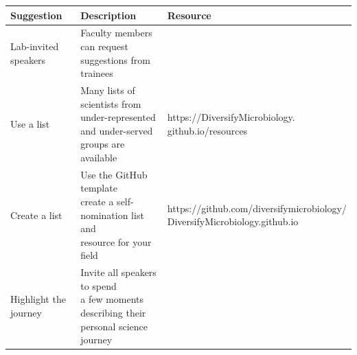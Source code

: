 \documentclass[10pt,]{article}
\begin{document}
\newpage

\begin{center}
\small
\begin{tabular}{|l|l|l|}
\hline

\rowcolor{lightgray}
\textbf{Suggestion} & \textbf{Description} & \textbf{Resource} \\ \hline

Lab-invited speakers & \makecell[l]{Faculty members can request \\suggestions from trainees} & \\ \hline

Use a list & \makecell[l]{Many lists of scientists from \\under-represented and under-served \\groups are available} &  \makecell[l]{https://DiversifyMicrobiology.\\github.io/resources}\\ \hline

Create a list & \makecell[l]{Use the GitHub template \\ create a self-nomination list and \\resource for your field} & \makecell[l]{https://github.com/diversifymicrobiology/\\DiversifyMicrobiology.github.io} \\ \hline

Highlight the journey & \makecell[l]{Invite all speakers to spend \\a few moments describing their \\personal science journey} & \\ \hline

\end{tabular}
\end{center}
\end{document}
